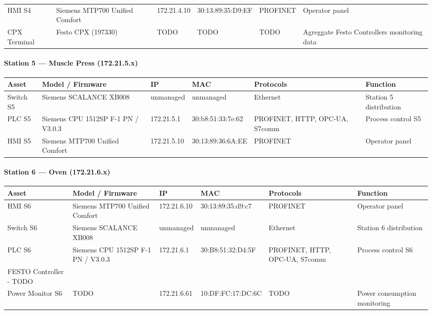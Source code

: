 \documentclass[11pt,a4paper]{article}
\begin{document}
{\begin{longtable}{L{2cm} L{2.1cm} L{2.1cm} L{2.6cm} L{2.4cm} L{4cm}}
    HMI S4 & Siemens MTP700 Unified Comfort & 172.21.4.10 & 30:13:89:35:D9:EF &
    PROFINET & Operator panel \\

    CPX Terminal & Festo CPX (197330) & TODO & TODO & TODO & Agreggate Festo Controllers monitoring data \\
\bottomrule
\end{longtable}

\paragraph{Station 5 --- Muscle Press (172.21.5.x)}
\begin{longtable}{L{2cm} L{2.1cm} L{2.1cm} L{2.6cm} L{2.4cm} L{4cm}}
\toprule
\textbf{Asset} & \textbf{Model / Firmware} & \textbf{IP} & \textbf{MAC} & \textbf{Protocols} & \textbf{Function} \\
\midrule \endhead
    Switch S5 & Siemens SCALANCE XB008 & unmanaged & unmanaged & Ethernet &
    Station 5 distribution \\

    PLC S5 & Siemens CPU 1512SP F-1 PN / V3.0.3 & 172.21.5.1 & 30:b8:51:33:7e:62 &
    PROFINET, HTTP, OPC-UA, S7comm & Process control S5 \\

    HMI S5 & Siemens MTP700 Unified Comfort & 172.21.5.10 & 30:13:89:36:6A:EE &
    PROFINET & Operator panel \\

\bottomrule
\end{longtable}

\paragraph{Station 6 --- Oven (172.21.6.x)}
\begin{longtable}{L{2cm} L{2.1cm} L{2.1cm} L{2.6cm} L{2.4cm} L{4cm}}
\toprule
\textbf{Asset} & \textbf{Model / Firmware} & \textbf{IP} & \textbf{MAC} & \textbf{Protocols} & \textbf{Function} \\
\midrule \endhead
HMI S6 & Siemens MTP700 Unified Comfort & 172.21.6.10 & 30:13:89:35:d9:c7 & PROFINET & Operator panel \\

Switch S6 & Siemens SCALANCE XB008 & unmanaged & unmanaged & Ethernet & Station 6 distribution \\

PLC S6 & Siemens CPU 1512SP F-1 PN / V3.0.3 & 172.21.6.1 & 30:B8:51:32:D4:5F & PROFINET, HTTP, OPC-UA, S7comm & Process control S6 \\

FESTO Controller - TODO\\

Power Monitor S6 & TODO & 172.21.6.61 & 10:DF:FC:17:DC:6C & TODO & Power consumption monitoring \\
\bottomrule
\end{longtable}
} %
\end{document}
